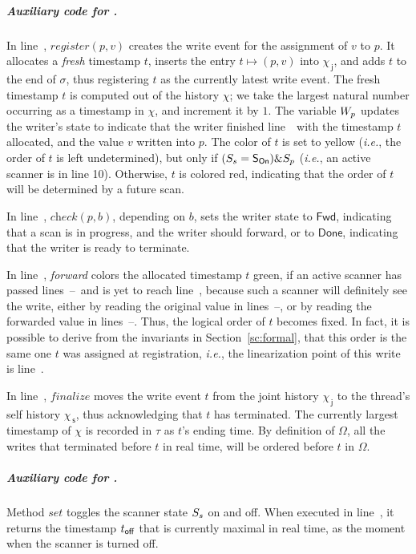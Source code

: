 \documentclass[a4paper,UKenglish]{lipics-v2016}
\newcommand{\ie}{\emph{i.e.}\xspace}
\newcommand{\aux}[1]{\textit{#1}}
\newcommand{\selfsub}{\mathsf{s}}
\newcommand{\jointsub}{\mathsf{j}}
\newcommand{\hist}{\chi}
\newcommand{\histS}{\hist_{\, \selfsub}}
\newcommand{\histJ}{\hist_{\, \jointsub}}
\def\ordlist{\sigma}
\newcommand{\E}{\tau}
\newcommand{\stableorder}{\Omega}
\newcommand{\wDirty}{\mathsf{Fwd}}
\newcommand{\wClean}{\mathsf{Done}}
\newcommand{\sOn}{\mathsf{S_{On}}}
\theoremstyle{definition}
\begin{document}
\subparagraph*{Auxiliary code for \jywrite.}
%
In line~\lineWrtWrt, $\aux{register}(p, v)$ creates the write event
for the assignment of $v$ to $p$. It allocates a \emph{fresh}
timestamp $t$, inserts the entry $t \mapsto (p, v)$ into $\histJ$, and
adds $t$ to the end of $\ordlist$, thus registering $t$ as the
currently latest write event. The fresh timestamp $t$ is computed out
of the history $\hist$; we take the largest natural number occurring
as a timestamp in $\hist$, and increment it by $1$.  The variable
$W_p$ updates the writer's state to indicate that the writer finished
line~\lineWrtWrt\ with the timestamp $t$ allocated, and the value $v$
written into $p$. The color of $t$ is set to yellow (\ie, the order of
$t$ is left undetermined), but only if $(\sss= \sOn) \& \spp$ (\ie, an
active scanner is in line 10). Otherwise, $t$ is colored red,
indicating that the order of $t$ will be determined by a future scan.

In line~\lineWrtChk, $\aux{check}(p,b)$, depending on $b$, sets the
writer state to $\wDirty$, indicating that a scan is in progress, and
the writer should forward, or to $\wClean$, indicating that the writer
is ready to terminate.

In line~\lineWrtFwd, \aux{forward} colors the allocated timestamp $t$
green, if an active scanner has passed
lines~\lineScanClearsX--\lineScanClearsY~and is yet to reach
line~\lineScanUnsetsS, because such a scanner will definitely see the
write, either by reading the original value in
lines~\lineScanReadsX--\lineScanReadsY, or by reading the forwarded
value in lines~\lineScanReadsFX--\lineScanReadsFY. Thus, the logical
order of $t$ becomes fixed. In fact, it is possible to derive from the
invariants in Section~\ref{sc:formal}, that this order is the same one
$t$ was assigned at registration, \ie, the linearization point of
this write is line~\lineWrtWrt.

In line~\lineWrtFnz, $\aux{finalize}$ moves the write event $t$ from
the joint history $\histJ$ to the thread's self history $\histS$, thus
acknowledging that $t$ has terminated. The currently largest timestamp
of $\hist$ is recorded in $\E$ as $t$'s ending time. By definition of
$\stableorder$, all the writes that terminated before $t$ in real
time, will be ordered before $t$ in $\stableorder$.

\subparagraph*{Auxiliary code for \jyscan.} 
%
Method $\aux{set}$ toggles the scanner state $S_s$ on and off. When
executed in line~\lineScanUnsetsS, it returns the timestamp $t_{\mathsf{off}}$
that is currently maximal in real time, as the moment when the scanner
is turned off.
%
\end{document}
